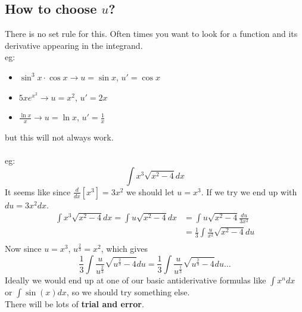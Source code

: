 \documentclass[11pt, a4paper]{memoir}
\theoremstyle{change}
\theoremstyle{plain}
\theoremstyle{nonumberplain}
\numberwithin{equation}{section}
\begin{document}
\subsection{How to choose $u$?}
There is no set rule for this. Often times you want to look for a function and its derivative appearing in the integrand.\\
eg: 
\begin{itemize}
  \item $\sin^3x \cdot \cos x \to u = \sin x$, $u'= \cos x$
  \item $5xe^{x^2} \to u = x^2$, $u'=2x$
  \item $\frac{\ln x}{x} \to u = \ln x$, $u' = \frac{1}{x}$
\end{itemize}
but this will not always work. \\ \vspace{0.5ex} \\
eg: $$\int x^3 \sqrt{x^2 - 4} dx$$
It seems like since $\frac{d}{dx}[x^3] = 3x^2$ we should let $u = x^3$.
If we try we end up with $du = 3x^2 dx$. 
\begin{align*}
  \int x^3 \sqrt{x^2 - 4} dx = \int u \sqrt{x^2 - 4} dx &= \int u \sqrt{x^2 - 4} \frac{du}{3x^2}\\
  &= \frac{1}{3} \int \frac{u}{x^2} \sqrt{x^2 - 4} du\\
\end{align*}
Now since $u = x^3$, $u^{\frac{2}{3}} = x^2$, which gives 
$$\frac{1}{3} \int \frac{u}{u^{\frac{2}{3}}} \sqrt{u^{\frac{2}{3}} - 4}du = 
\frac{1}{3} \int \frac{u}{u^{\frac{1}{3}}} \sqrt{u^{\frac{2}{3}} - 4} du \dots$$
Ideally we would end up at one of our basic antiderivative formulas like $\int x^n dx$ or $\int \sin (x) dx$, so we should
try something else. \\
There will be lots of \textbf{trial and error}.
\end{document}
